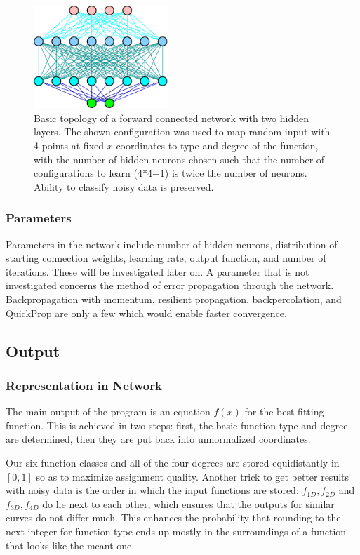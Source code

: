 \documentclass[useAMS,usenatbib]{templates/mn2e}
\begin{document}
 \begin{figure}
   \begin{center}
     \includegraphics[width=0.45\textwidth]{fig/network_topology.eps}
   \end{center}
   \caption{\label{fig:network_topology}Basic topology of a forward
     connected network with two hidden layers. The shown configuration
     was used to map random input with 4 points at fixed
     $x$-coordinates to type and degree of the function, with the
     number of hidden neurons chosen such that the number of
     configurations to learn (4*4+1) is twice the number of
     neurons. Ability to classify noisy data is preserved.}
 \end{figure}
%
\subsubsection{Parameters}
Parameters in the network include number of hidden neurons,
distribution of starting connection weights, learning rate, output
function, and number of iterations. These will be investigated later
on. A parameter that is not investigated concerns the method of error
propagation through the network. Backpropagation with momentum,
resilient propagation, backpercolation, and QuickProp are only a few
which would enable faster convergence.

\subsection{Output}
\subsubsection{Representation in Network}
The main output of the program is an equation $f(x)$ for the best
fitting function. This is achieved in two steps: first, the basic
function type and degree are determined, then they are put back into
unnormalized coordinates.

Our six function classes and all of the four degrees are stored
equidistantly in $[0,1]$ so as to maximize assignment quality. Another
trick to get better results with noisy data is the order in which the
input functions are stored: $f_{1D},f_{2D}$ and $f_{3D},f_{4D}$ do lie
next to each other, which ensures that the outputs for similar curves
do not differ much. This enhances the probability that rounding to the
next integer for function type ends up mostly in the surroundings of a
function that looks like the meant one.
%
\end{document}
